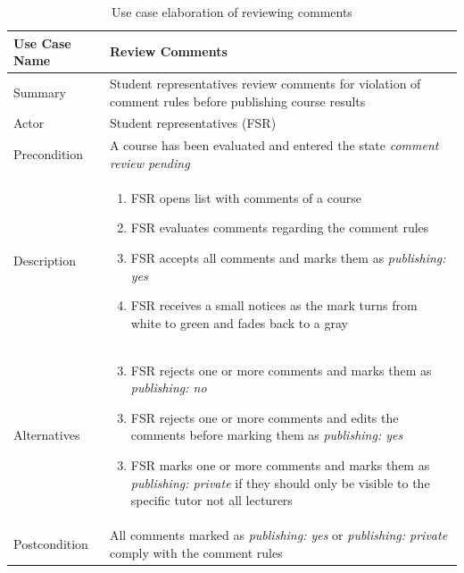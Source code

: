 \begin{table}[]
    \centering
    \begin{tabularx}{\textwidth}{|l|X|}
        \hline
        Use Case Name                      
            & Review Comments       \\ \hline 
        Summary                           
            & Student representatives review comments for violation of comment rules before publishing course results                \\ \hline
        Actor 
            & Student representatives (FSR)         \\ \hline
        Precondition          
            & A course has been evaluated and entered the state \emph{comment review pending} \\ \hline
        Description               
            & 	\begin{enumerate}
                    \item FSR opens list with comments of a course
                    \item FSR evaluates comments regarding the comment rules
                    \item FSR accepts all comments and marks them as \emph{publishing: yes}
                    \item FSR receives a small notices as the mark turns from white to green and fades back to a gray
                \end{enumerate}          \\ \hline
        Alternatives                 
            & 	\begin{enumerate}
                    \setcounter{enumi}{2}
                    \item FSR rejects one or more comments and marks them as \emph{publishing: no}
                \end{enumerate}
                \begin{enumerate}
                    \setcounter{enumi}{2}
                    \item FSR rejects one or more comments  and edits the comments before marking them as \emph{publishing: yes}
                \end{enumerate}
                \begin{enumerate}
                    \setcounter{enumi}{2}
                    \item FSR marks one or more comments and marks them as \emph{publishing: private} if they should only be visible to the specific tutor not all lecturers
                \end{enumerate}     \\ \hline
        Postcondition        
            & All comments marked as \emph{publishing: yes} or \emph{publishing: private} comply with the comment rules         \\ \hline
    \end{tabularx}
    \caption{Use case elaboration of reviewing comments}
    \label{tab:use-case}
\end{table}

